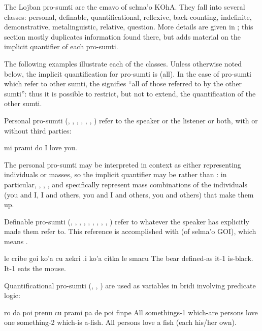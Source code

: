 The Lojban pro-sumti are the cmavo of selma'o KOhA. They
    fall into several classes: personal, definable,
    quantificational, reflexive, back-counting, indefinite,
    demonstrative, metalinguistic, relative, question. More details
    are given in ; this section
    mostly duplicates information found there, but adds material on
    the implicit quantifier of each pro-sumti.

The following examples illustrate each of the classes.
    Unless otherwise noted below, the implicit quantification for
    pro-sumti is  (all). In the case of pro-sumti which refer
    to other sumti, the  signifies ``all of those referred to
    by the other sumti'': thus it is possible to restrict, but not
    to extend, the quantification of the other sumti.

Personal pro-sumti (, , , ,
    , , ) refer to the speaker or the
    listener or both, with or without third parties:
\begin{example}
mi prami do\n
I love you.
\end{example}

The personal pro-sumti may be interpreted in context as either
    representing individuals or masses, so the implicit quantifier
    may be  rather than : in particular, ,
    , , and  specifically represent mass
    combinations of the individuals (you and I, I and others, you
    and I and others, you and others) that make them up. 

Definable pro-sumti (, , , ,
    , , , , , )
    refer to whatever the speaker has explicitly made them refer
    to. This reference is accomplished with  (of selma'o
    GOI), which means .
\begin{example}
le cribe goi ko'a cu xekri\n
\T	.i ko'a citka le smacu\n
The bear defined-as it-1 is-black.\n
\T	It-1 eats the mouse.
\end{example}

Quantificational pro-sumti (, , ) are used as
    variables in bridi involving predicate logic:
\begin{example}
ro da poi prenu\n
\T	cu prami pa de poi finpe\n
All somethings-1 which-are persons\n
\T	love one something-2 which-is a-fish.\n
All persons love a fish (each his/her own).
\end{example}

